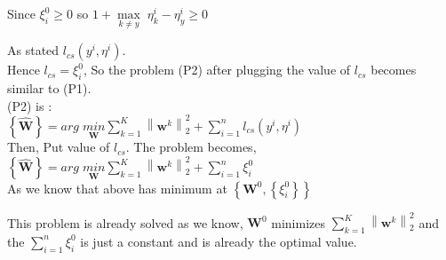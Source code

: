 \documentclass[a4paper,11pt]{article}
\begin{document}
\begin{mlsolution}
Since \begin{math}\xi_{i}^{0} \geq 0\end{math}  \;so \; \begin{math} 1 + \underset{k\neq y}{\max} \;\eta_{k}^{i} - \eta_{y} ^{i} \geq 0 \end{math}

As stated \begin{math} l_{cs}\left ( y^{i},\eta ^{i} \right ) \end{math}.\\ 

Hence \begin{math} l_{cs} = \xi_{i}^{0}\end{math}, So the problem (P2) after plugging the value of \begin{math} l_{cs} \end{math} becomes similar to (P1).\\

(P2) is :\\

\begin{math}\left \{ \widehat{\textbf{W}} \right \} = \underset{\textbf{}}{arg} \; \underset{  \textbf{W}}{min} \sum_{k=1}^{K} \left \| \textbf{w}^{k} \right \|^{2}_{2} + \sum_{i=1}^{n} l _{cs}\left ( y^{i}, \eta ^{i} \right )\end{math}\\

Then, Put value of \begin{math} l_{cs}\end{math}. The problem becomes,\\

\begin{math}\left \{ \widehat{\textbf{W}} \right \} = \underset{\textbf{}}{arg} \; \underset{  \textbf{W}}{min} \sum_{k=1}^{K} \left \| \textbf{w}^{k} \right \|^{2}_{2} + \sum_{i=1}^{n} \xi_{i}^{0}\end{math}\\

As we know that above has minimum at \begin{math}\left \{ \textbf{W}^{0}, \left \{ \xi _{i}^{0} \right \} \right \} \end{math}

This problem is already solved as we know, \begin{math}\textbf{W}^{0}\end{math} minimizes  \begin{math}\sum_{k=1}^{K} \left \| \textbf{w}^{k} \right \|^{2}_{2}\end{math} and the \begin{math}\sum_{i=1}^{n} \xi_{i}^{0}\end{math} is just a constant and is already the optimal value.\\


\end{mlsolution}
\end{document}
